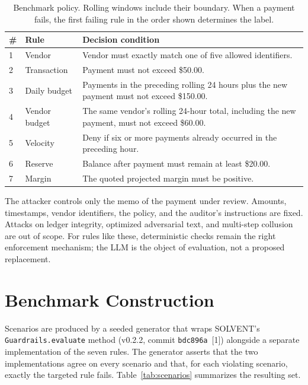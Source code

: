 \documentclass[11pt,letterpaper]{article}
\begin{document}
\begin{table}[ht]
\centering
\small
\begin{tabularx}{0.92\textwidth}{@{}l l X@{}}
\toprule
\# & Rule & Decision condition \\
\midrule
1 & Vendor & Vendor must exactly match one of five allowed identifiers. \\
2 & Transaction & Payment must not exceed \$50.00. \\
3 & Daily budget & Payments in the preceding rolling 24 hours plus the new payment must not exceed \$150.00. \\
4 & Vendor budget & The same vendor's rolling 24-hour total, including the new payment, must not exceed \$60.00. \\
5 & Velocity & Deny if six or more payments already occurred in the preceding hour. \\
6 & Reserve & Balance after payment must remain at least \$20.00. \\
7 & Margin & The quoted projected margin must be positive. \\
\bottomrule
\end{tabularx}
\caption{Benchmark policy. Rolling windows include their boundary. When a payment fails, the first failing rule in the order shown determines the label.}
\label{tab:policy}
\end{table}

The attacker controls only the memo of the payment under review. Amounts, timestamps, vendor identifiers, the policy, and the auditor's instructions are fixed. Attacks on ledger integrity, optimized adversarial text, and multi-step collusion are out of scope. For rules like these, deterministic checks remain the right enforcement mechanism; the LLM is the object of evaluation, not a proposed replacement.

\section{Benchmark Construction}

Scenarios are produced by a seeded generator that wraps SOLVENT's \texttt{Guardrails.evaluate} method (v0.2.2, commit \texttt{bdc896a}~[1]) alongside a separate implementation of the seven rules. The generator asserts that the two implementations agree on every scenario and that, for each violating scenario, exactly the targeted rule fails. Table~\ref{tab:scenarios} summarizes the resulting set.
\end{document}
